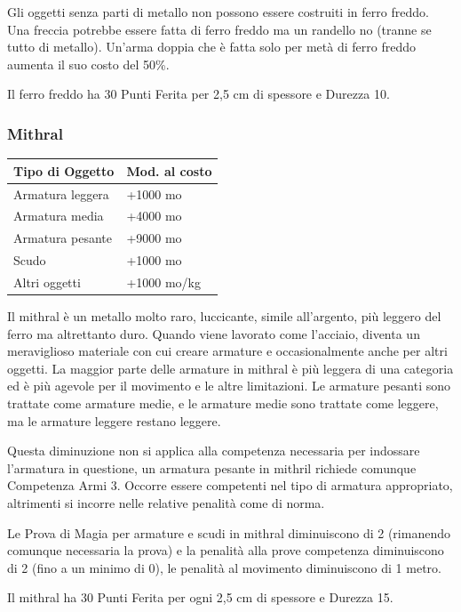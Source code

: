 \begin{multicols}{2}
Gli oggetti senza parti di metallo non possono essere costruiti in ferro freddo. Una freccia potrebbe essere fatta di ferro freddo ma un randello no (tranne se tutto di metallo). Un'arma doppia che è fatta solo per metà di ferro freddo aumenta il suo costo del 50\%.

Il ferro freddo ha 30 Punti Ferita per 2,5 cm di spessore e Durezza 10.

\subsubsection{Mithral}

\label{mithral}

\begin{tabularx}{0.48\textwidth}{Xl}
\textbf{Tipo di Oggetto} & \textbf{Mod. al costo}\\
\toprule
Armatura leggera & +1000 mo\\
Armatura media & +4000 mo\\
Armatura pesante & +9000 mo\\
Scudo & +1000 mo\\
Altri oggetti & +1000 mo/kg
\end{tabularx}

\medskip

Il mithral è un metallo molto raro, luccicante, simile all'argento, più leggero del ferro ma altrettanto duro. Quando viene lavorato come l'acciaio, diventa un meraviglioso materiale con cui creare armature e occasionalmente anche per altri oggetti. La maggior parte delle armature in mithral è più leggera di una categoria ed è più agevole per il movimento e le altre limitazioni. Le armature pesanti sono trattate come armature medie, e le armature medie sono trattate come leggere, ma le armature leggere restano leggere.

Questa diminuzione non si applica alla competenza necessaria per indossare l'armatura in questione, un armatura pesante in mithril richiede comunque Competenza Armi 3. Occorre essere competenti nel tipo di armatura appropriato, altrimenti si incorre nelle relative penalità come di norma.

Le Prova di Magia per armature e scudi in mithral diminuiscono di 2 (rimanendo comunque necessaria la prova) e la penalità alla prove competenza diminuiscono di 2 (fino a un minimo di 0), le penalità al movimento diminuiscono di 1 metro.

Il mithral ha 30 Punti Ferita per ogni 2,5 cm di spessore e Durezza 15.


\end{multicols}
